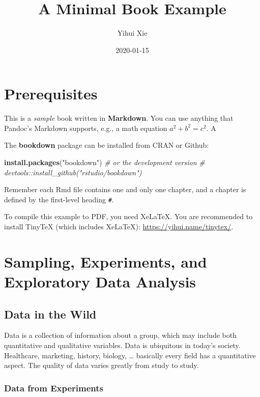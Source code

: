 \documentclass[]{book}
\title{A Minimal Book Example}
\author{Yihui Xie}
\date{2020-01-15}
\newenvironment{Shaded}{\begin{snugshade}}{\end{snugshade}}
\newcommand{\KeywordTok}[1]{\textcolor[rgb]{0.13,0.29,0.53}{\textbf{#1}}}
\newcommand{\StringTok}[1]{\textcolor[rgb]{0.31,0.60,0.02}{#1}}
\newcommand{\CommentTok}[1]{\textcolor[rgb]{0.56,0.35,0.01}{\textit{#1}}}
\newcommand{\NormalTok}[1]{#1}
\begin{document}
\maketitle

{
\setcounter{tocdepth}{1}
\tableofcontents
}
\chapter{Prerequisites}\label{prerequisites}

This is a \emph{sample} book written in \textbf{Markdown}. You can use
anything that Pandoc's Markdown supports, e.g., a math equation
\(a^2 + b^2 = c^2\). A

The \textbf{bookdown} package can be installed from CRAN or Github:

\begin{Shaded}
\begin{Highlighting}[]
\KeywordTok{install.packages}\NormalTok{(}\StringTok{"bookdown"}\NormalTok{)}
\CommentTok{# or the development version}
\CommentTok{# devtools::install_github("rstudio/bookdown")}
\end{Highlighting}
\end{Shaded}

Remember each Rmd file contains one and only one chapter, and a chapter
is defined by the first-level heading \texttt{\#}.

To compile this example to PDF, you need XeLaTeX. You are recommended to
install TinyTeX (which includes XeLaTeX):
\url{https://yihui.name/tinytex/}.

\chapter{Sampling, Experiments, and Exploratory Data
Analysis}\label{sampling-experiments-and-exploratory-data-analysis}

\section{Data in the Wild}\label{data-in-the-wild}

Data is a collection of information about a group, which may include
both quantitative and qualitative variables. Data is ubiquitous in
today's society. Healthcare, marketing, history, biology, \ldots{}
basically every field has a quantitative aspect. The quality of data
varies greatly from study to study.

\subsection{Data from Experiments}\label{data-from-experiments}
\end{document}
